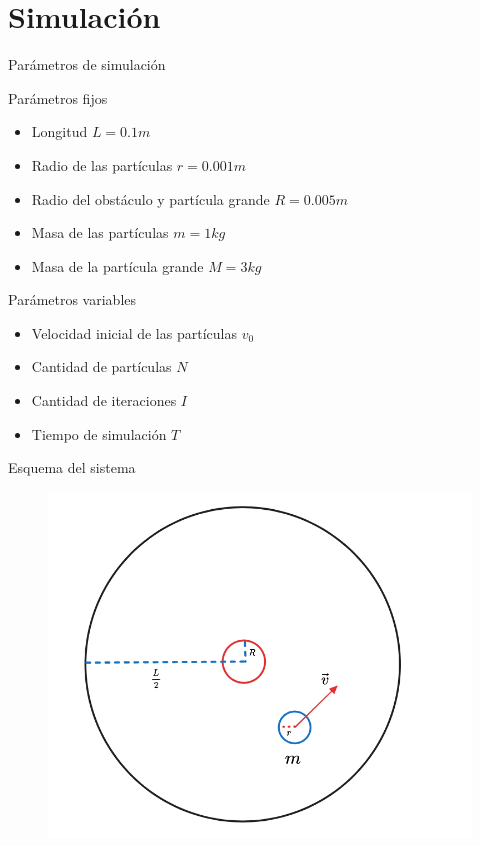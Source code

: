 \section{Simulación}\label{sec:simulacion}

\begin{frame}{Parámetros de simulación}
    \begin{block}{Parámetros fijos}
        \begin{itemize}
            \item Longitud $L = 0.1 m$
            \item Radio de las partículas $r = 0.001 m$
            \item Radio del obstáculo y partícula grande $R = 0.005 m$
            \item Masa de las partículas $m = 1 kg$
            \item Masa de la partícula grande $M = 3 kg$
        \end{itemize}
    \end{block}

    \begin{block}{Parámetros variables}
        \begin{itemize}
            \item Velocidad inicial de las partículas $v_0$
            \item Cantidad de partículas $N$
            \item Cantidad de iteraciones $I$
            \item Tiempo de simulación $T$
        \end{itemize}
    \end{block}

\end{frame}

\begin{frame}{Esquema del sistema}
    \begin{figure}[H]
        \centering
        \includegraphics[width=0.4\linewidth]{pic/04-sim/system-schema}\label{fig:figure-system-schema}
    \end{figure}
\end{frame}

